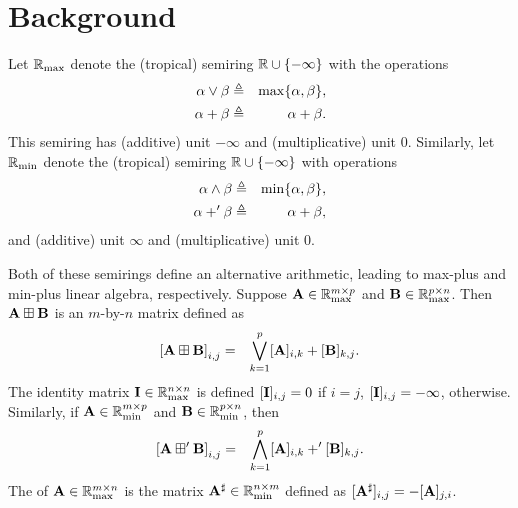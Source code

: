 \documentclass[letterpaper, 10 pt, conference]{ieeeconf}
\begin{document}
\section{Background}
\label{sec:background}

Let $\mathbb{R}_{\mathrm{max}}$ denote the  (tropical) semiring $\mathbb{R} \cup \{-\infty\}$ with the operations
\begin{align*}
    \alpha \vee \beta &\triangleq& \max\{\alpha, \beta\}, \\
    \alpha + \beta &\triangleq& \alpha + \beta.
\end{align*}
This semiring has (additive) unit $-\infty$ and (multiplicative) unit $0$. Similarly, let $\mathbb{R}_{\mathrm{min}}$ denote the  (tropical) semiring $\mathbb{R} \cup \{-\infty\}$ with operations
\begin{align*}
    \alpha \wedge \beta &\triangleq& \min\{\alpha, \beta\}, \\
    \alpha +' \beta &\triangleq& \alpha + \beta,
\end{align*}
and (additive) unit $\infty$ and (multiplicative) unit $0$.

Both of these semirings define an alternative arithmetic, leading to max-plus and min-plus linear algebra, respectively.
Suppose $\mathbf{A} \in \mathbb{R}_{\mathrm{max}}^{m \times p}$ and $\mathbf{B} \in \mathbb{R}_{\mathrm{max}}^{p \times n}$. Then $\mathbf{A} \boxplus \mathbf{B}$ is an $m$-by-$n$ matrix defined as
\begin{align}
    \left[ \mathbf{A} \boxplus \mathbf{B} \right]_{i,j} &=& \bigvee_{k=1}^{p} [\mathbf{A}]_{i,k} + [\mathbf{B}]_{k,j}. \label{eq:matrix-multiply}
\end{align}
The identity matrix $\mathbf{I} \in \mathbb{R}_{\mathrm{max}}^{n \times n}$ is defined $[\mathbf{I}]_{i,j} = 0$ if $i=j$, $[\mathbf{I}]_{i,j} = -\infty$, otherwise.
Similarly, if $\mathbf{A} \in \mathbb{R}_{\mathrm{min}}^{m \times p}$ and $\mathbf{B} \in \mathbb{R}_{\mathrm{min}}^{p \times n}$, then
\begin{align}
    \left[ \mathbf{A} \boxplus' \mathbf{B} \right]_{i,j} &=& \bigwedge_{k=1}^{p} [\mathbf{A}]_{i,k} +' [\mathbf{B}]_{k,j}. \label{eq:matrix-multiply-2}
\end{align} 
The  of $\mathbf{A} \in \mathbb{R}_{\mathrm{max}}^{m \times n}$ is the matrix ${\mathbf{A}}^{\sharp} \in \mathbb{R}_{\mathrm{min}}^{n \times m}$ defined as $[{\mathbf{A}}^{\sharp}]_{i,j} = -[\mathbf{A}]_{j,i}$.
\end{document}
